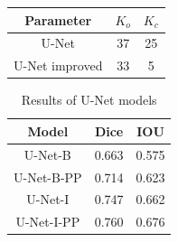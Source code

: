 \begin{table}[H]
    \centering
    \begin{tabular}{|c|c|c|}
        \hline
        Parameter      & $K_o$ & $K_c$ \\ \hline
        U-Net          & 37    & 25    \\ \hline
        U-Net improved & 33    & 5     \\ \hline
    \end{tabular}
\end{table}

\begin{table}[H]
    \centering
    \begin{tabular}{|c|c|c|}
        \hline
        Model      & Dice  & IOU   \\ \hline
        U-Net-B    & 0.663 & 0.575 \\ \hline
        U-Net-B-PP & 0.714 & 0.623 \\ \hline
        U-Net-I    & 0.747 & 0.662 \\ \hline
        U-Net-I-PP & 0.760 & 0.676 \\ \hline
    \end{tabular}
    \caption{Results of U-Net models}
\end{table}

